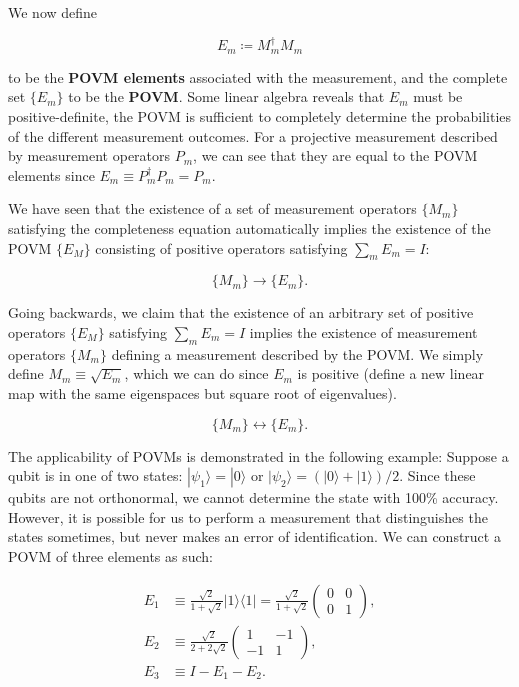 \documentclass{article}
\theoremstyle{definition}
\begin{document}
      We now define

        \[E_m \coloneqq M_m^\dagger M_m\]

      to be the \textbf{POVM elements} associated with the measurement, and the complete set $\{E_m\}$ to be the \textbf{POVM}. Some linear algebra reveals that $E_m$ must be positive-definite, the POVM is sufficient to completely determine the probabilities of the different measurement outcomes. For a projective measurement described by measurement operators $P_m$, we can see that they are equal to the POVM elements since $E_m \equiv P_m^\dagger P_m = P_m$.

      We have seen that the existence of a set of measurement operators $\{M_m\}$ satisfying the completeness equation automatically implies the existence of the POVM $\{E_M\}$ consisting of positive operators satisfying $\sum_m E_m = I$:

        \[\{M_m\} \longrightarrow \{E_m\}.\]

      Going backwards, we claim that the existence of an arbitrary set of positive operators $\{E_M\}$ satisfying $\sum_m E_m = I$ implies the existence of measurement operators $\{M_m\}$ defining a measurement described by the POVM. We simply define $M_m \equiv \sqrt{E_m}$, which we can do since $E_m$ is positive (define a new linear map with the same eigenspaces but square root of eigenvalues).

        \[\{M_m\} \longleftrightarrow \{E_m\}.\]

      The applicability of POVMs is demonstrated in the following example: Suppose a qubit is in one of two states: $|\psi_1 \rangle = |0 \rangle$ or $|\psi_2 \rangle = (|0 \rangle + |1 \rangle)/2$. Since these qubits are not orthonormal, we cannot determine the state with 100\% accuracy. However, it is possible for us to perform a measurement that distinguishes the states sometimes, but never makes an error of identification. We can construct a POVM of three elements as such:

      \begin{align*}
        E_1 & \equiv \frac{\sqrt{2}}{1 + \sqrt{2}} |1\rangle \langle 1| = \frac{\sqrt{2}}{1 + \sqrt{2}} \begin{pmatrix} 0&0\\0&1 \end{pmatrix}, \\
        E_2 & \equiv \frac{\sqrt{2}}{2 + 2 \sqrt{2}} \begin{pmatrix} 1 & -1 \\ -1 & 1 \end{pmatrix}, \\
        E_3 & \equiv I - E_1 - E_2.
      \end{align*}
\end{document}

